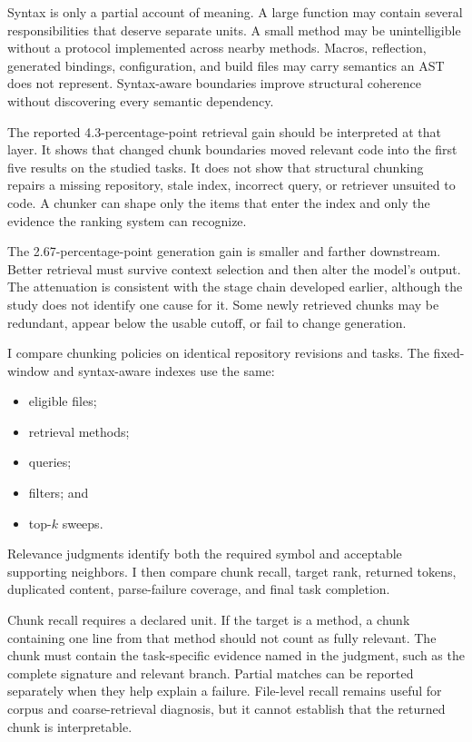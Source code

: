 Syntax is only a partial account of meaning. A large function may contain several responsibilities that deserve separate units. A small method may be unintelligible without a protocol implemented across nearby methods. Macros, reflection, generated bindings, configuration, and build files may carry semantics an AST does not represent. Syntax-aware boundaries improve structural coherence without discovering every semantic dependency.

The reported 4.3-percentage-point retrieval gain should be interpreted at that layer. It shows that changed chunk boundaries moved relevant code into the first five results on the studied tasks. It does not show that structural chunking repairs a missing repository, stale index, incorrect query, or retriever unsuited to code. A chunker can shape only the items that enter the index and only the evidence the ranking system can recognize.

The 2.67-percentage-point generation gain is smaller and farther downstream. Better retrieval must survive context selection and then alter the model's output. The attenuation is consistent with the stage chain developed earlier, although the study does not identify one cause for it. Some newly retrieved chunks may be redundant, appear below the usable cutoff, or fail to change generation.

I compare chunking policies on identical repository revisions and tasks. The fixed-window and syntax-aware indexes use the same:

\begin{itemize}
\tightlist
\item
  eligible files;
\item
  retrieval methods;
\item
  queries;
\item
  filters; and
\item
  top-\(k\) sweeps.
\end{itemize}

Relevance judgments identify both the required symbol and acceptable supporting neighbors. I then compare chunk recall, target rank, returned tokens, duplicated content, parse-failure coverage, and final task completion.

Chunk recall requires a declared unit. If the target is a method, a chunk containing one line from that method should not count as fully relevant. The chunk must contain the task-specific evidence named in the judgment, such as the complete signature and relevant branch. Partial matches can be reported separately when they help explain a failure. File-level recall remains useful for corpus and coarse-retrieval diagnosis, but it cannot establish that the returned chunk is interpretable.

